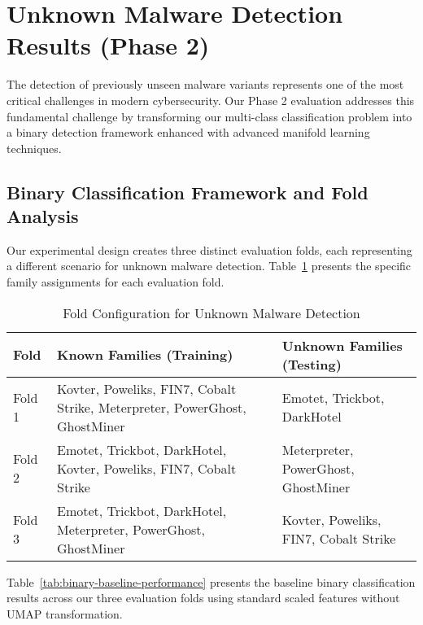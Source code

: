 \section{Unknown Malware Detection Results (Phase 2)}
\label{sec:unknown-malware-detection}

The detection of previously unseen malware variants represents one of the most critical challenges in modern cybersecurity. Our Phase 2 evaluation addresses this fundamental challenge by transforming our multi-class classification problem into a binary detection framework enhanced with advanced manifold learning techniques.

\subsection{Binary Classification Framework and Fold Analysis}
\label{subsec:binary-classification-framework}

Our experimental design creates three distinct evaluation folds, each representing a different scenario for unknown malware detection. Table~\ref{tab:fold-configuration} presents the specific family assignments for each evaluation fold.

\begin{table}[!htbp]
\centering
\caption{Fold Configuration for Unknown Malware Detection}
\label{tab:fold-configuration}
\begin{tabular}{|l|p{4.5cm}|p{4.5cm}|}
\hline
\textbf{Fold} & \textbf{Known Families (Training)} & \textbf{Unknown Families (Testing)} \\
\hline
Fold 1 & Kovter, Poweliks, FIN7, Cobalt Strike, Meterpreter, PowerGhost, GhostMiner & Emotet, Trickbot, DarkHotel \\
\hline
Fold 2 & Emotet, Trickbot, DarkHotel, Kovter, Poweliks, FIN7, Cobalt Strike & Meterpreter, PowerGhost, GhostMiner \\
\hline
Fold 3 & Emotet, Trickbot, DarkHotel, Meterpreter, PowerGhost, GhostMiner & Kovter, Poweliks, FIN7, Cobalt Strike \\
\hline
\end{tabular}
\end{table}

Table~\ref{tab:binary-baseline-performance} presents the baseline binary classification results across our three evaluation folds using standard scaled features without UMAP transformation.


